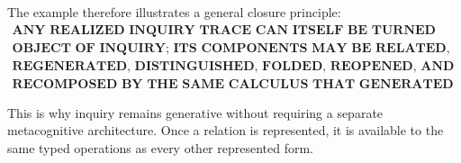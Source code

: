 The example therefore illustrates a general closure principle:
\[
\boxed{
\begin{gathered}
\textbf{ANY REALIZED INQUIRY TRACE CAN ITSELF BE TURNED INTO AN}\\
\textbf{OBJECT OF INQUIRY; ITS COMPONENTS MAY BE RELATED, REMOVED,}\\
\textbf{REGENERATED, DISTINGUISHED, FOLDED, REOPENED, AND}\\
\textbf{RECOMPOSED BY THE SAME CALCULUS THAT GENERATED THE TRACE.}
\end{gathered}
}
\]

This is why inquiry remains generative without requiring a separate
metacognitive architecture.  Once a relation is represented, it is available
to the same typed operations as every other represented form.
